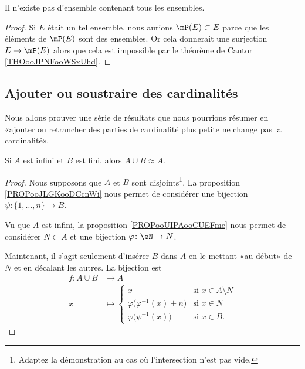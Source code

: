 \begin{corollary}       \label{CORooZMAOooPfJosM}
    Il n'existe pas d'ensemble contenant tous les ensembles.
\end{corollary}

\begin{proof}
    Si \( E\) était un tel ensemble, nous aurions \( \mP(E)\subset E\) parce que les éléments de \( \mP(E)\) sont des ensembles. Or cela donnerait une surjection \( E\to \mP(E)\) alors que cela est impossible par le théorème de Cantor \ref{THOooJPNFooWSxUhd}.
\end{proof}

\subsection{Ajouter ou soustraire des cardinalités}

Nous allons prouver une série de résultats que nous pourrions résumer en  «ajouter ou retrancher des parties de cardinalité plus petite ne change pas la cardinalité».

\begin{lemma}        \label{LEMooUFCAooSyZtZj}
    Si \( A\) est infini et \( B\) est fini, alors \( A\cup B\approx A\).
\end{lemma}

\begin{proof}
    Nous supposons que \( A\) et \( B\) sont disjoints\footnote{Adaptez la démonstration au cas où l'intersection n'est pas vide.}. La proposition \ref{PROPooJLGKooDCcnWi} nous permet de considérer une bijection \( \psi\colon \{ 1,\ldots, n \}\to B\).
    
    Vu que \( A\) est infini, la proposition \ref{PROPooUIPAooCUEFme} nous permet de considérer \( N\subset A\) et une bijection \( \varphi\colon \eN\to N\).

    Maintenant, il s'agit seulement d'insérer \( B\) dans \( A\) en le mettant «au début» de \( N\) et en décalant les autres. La bijection est
    \begin{equation}
        \begin{aligned}
            f\colon A\cup B&\to A \\
            x&\mapsto \begin{cases}
                x    &   \text{si } x\in A\setminus N\\
                \varphi\big( \varphi^{-1}(x)+n \big)    &   \text{si } x\in N\\
                \varphi\big( \psi^{-1}(x) \big)    &    \text{si }x\in B.
            \end{cases}
        \end{aligned}
    \end{equation}
\end{proof}

